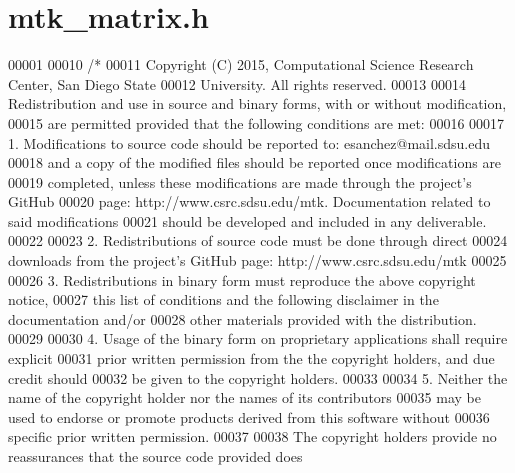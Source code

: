 \hypertarget{mtk__matrix_8h_source}{\section{mtk\+\_\+matrix.\+h}
\label{mtk__matrix_8h_source}
}

\begin{DoxyCode}
00001 
00010 \textcolor{comment}{/*}
00011 \textcolor{comment}{Copyright (C) 2015, Computational Science Research Center, San Diego State}
00012 \textcolor{comment}{University. All rights reserved.}
00013 \textcolor{comment}{}
00014 \textcolor{comment}{Redistribution and use in source and binary forms, with or without modification,}
00015 \textcolor{comment}{are permitted provided that the following conditions are met:}
00016 \textcolor{comment}{}
00017 \textcolor{comment}{1. Modifications to source code should be reported to: esanchez@mail.sdsu.edu}
00018 \textcolor{comment}{and a copy of the modified files should be reported once modifications are}
00019 \textcolor{comment}{completed, unless these modifications are made through the project's GitHub}
00020 \textcolor{comment}{page: http://www.csrc.sdsu.edu/mtk. Documentation related to said modifications}
00021 \textcolor{comment}{should be developed and included in any deliverable.}
00022 \textcolor{comment}{}
00023 \textcolor{comment}{2. Redistributions of source code must be done through direct}
00024 \textcolor{comment}{downloads from the project's GitHub page: http://www.csrc.sdsu.edu/mtk}
00025 \textcolor{comment}{}
00026 \textcolor{comment}{3. Redistributions in binary form must reproduce the above copyright notice,}
00027 \textcolor{comment}{this list of conditions and the following disclaimer in the documentation and/or}
00028 \textcolor{comment}{other materials provided with the distribution.}
00029 \textcolor{comment}{}
00030 \textcolor{comment}{4. Usage of the binary form on proprietary applications shall require explicit}
00031 \textcolor{comment}{prior written permission from the the copyright holders, and due credit should}
00032 \textcolor{comment}{be given to the copyright holders.}
00033 \textcolor{comment}{}
00034 \textcolor{comment}{5. Neither the name of the copyright holder nor the names of its contributors}
00035 \textcolor{comment}{may be used to endorse or promote products derived from this software without}
00036 \textcolor{comment}{specific prior written permission.}
00037 \textcolor{comment}{}
00038 \textcolor{comment}{The copyright holders provide no reassurances that the source code provided does}

\end{DoxyCode}
